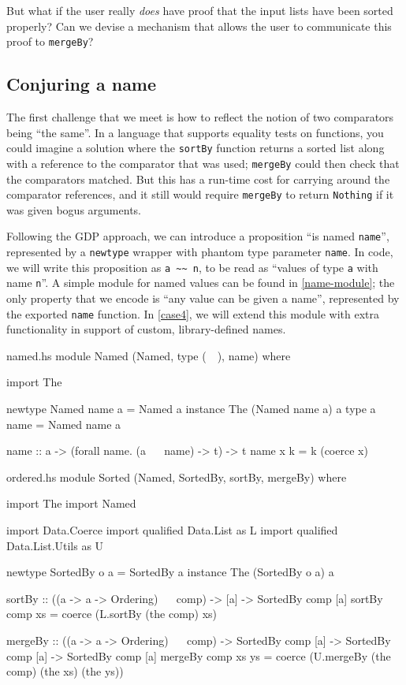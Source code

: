 \documentclass[format=sigplan, review=false, screen=true]{acmart}
\begin{document}
But what if the user really \emph{does} have proof that the input lists have
been sorted properly? Can we devise a mechanism that allows the user to communicate
this proof to \texttt{mergeBy}?

\subsection{Conjuring a name}
The first challenge that we meet is how to reflect the notion of two  comparators
being ``the same''. In a language that supports equality tests on functions,
you could imagine a solution where the \texttt{sortBy} function returns a sorted
list along with a reference to the comparator that was used; \texttt{mergeBy} could
then check that the comparators matched. But this has a run-time cost for carrying
around the comparator references, and it still would require \texttt{mergeBy} to
return \texttt{Nothing} if it was given bogus arguments.

Following the GDP approach, we can introduce a proposition ``is named \texttt{name}'',
represented by a \texttt{newtype} wrapper with phantom type parameter \texttt{name}.
In code, we will write this proposition as \verb|a ~~ n|, to be read as
``values of type \texttt{a} with name \texttt{n}''. A simple module for named values
can be found in \cref{name-module}; the only property that we encode is
``any value can be given a name'', represented by the exported \texttt{name} function.
In \cref{case4}, we will extend this module with extra functionality in support of
custom, library-defined names.


\begin{filecontents*}{named.hs}
module Named (Named, type (~~), name) where

import The

newtype Named name a = Named a
instance The (Named name a) a
type a ~~ name = Named name a

name :: a -> (forall name. (a ~~ name) -> t) -> t
name x k = k (coerce x)
\end{filecontents*}

\begin{filecontents*}{ordered.hs}
module Sorted (Named, SortedBy, sortBy, mergeBy) where   

import The
import Named

import           Data.Coerce
import qualified Data.List       as L
import qualified Data.List.Utils as U

newtype SortedBy o a = SortedBy a
instance The (SortedBy o a) a
  
sortBy :: ((a -> a -> Ordering) ~~ comp)
       -> [a]
       -> SortedBy comp [a]
sortBy comp xs = coerce (L.sortBy (the comp) xs)

mergeBy :: ((a -> a -> Ordering) ~~ comp)
        -> SortedBy comp [a]
        -> SortedBy comp [a]
        -> SortedBy comp [a]
mergeBy comp xs ys =
  coerce (U.mergeBy (the comp) (the xs) (the ys))        
\end{filecontents*}
\end{document}
